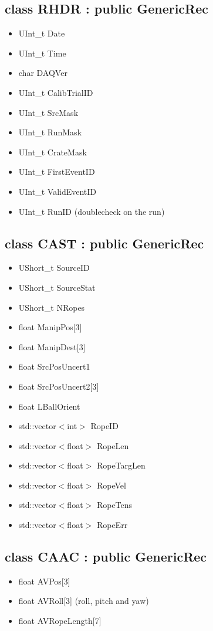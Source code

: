 \documentclass{article}
\begin{document}
\subsection{class RHDR : public GenericRec}
\begin{itemize}
\item UInt\_t Date
\item UInt\_t Time
\item char DAQVer
\item UInt\_t CalibTrialID
\item UInt\_t SrcMask
\item UInt\_t RunMask
\item UInt\_t CrateMask
\item UInt\_t FirstEventID
\item UInt\_t ValidEventID
\item UInt\_t RunID (doublecheck on the run)
\end{itemize}

\subsection{class CAST : public GenericRec}
\begin{itemize}
\item UShort\_t SourceID
\item UShort\_t SourceStat
\item UShort\_t NRopes
\item float ManipPos[3]
\item float ManipDest[3]
\item float SrcPosUncert1
\item float SrcPosUncert2[3]
\item float LBallOrient
\item std::vector$<$int$>$ RopeID
\item std::vector$<$float$>$ RopeLen
\item std::vector$<$float$>$ RopeTargLen
\item std::vector$<$float$>$ RopeVel
\item std::vector$<$float$>$ RopeTens
\item std::vector$<$float$>$ RopeErr
\end{itemize}

\subsection{class CAAC : public GenericRec}
\begin{itemize}
\item float AVPos[3]
\item float AVRoll[3] (roll, pitch and yaw)
\item float AVRopeLength[7]
\end{itemize}
\end{document}
